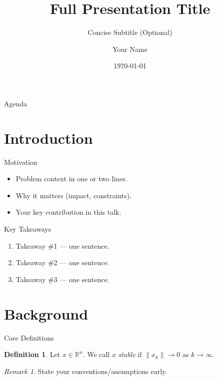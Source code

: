\documentclass[10pt,aspectratio=169]{beamer}
\title[Short Title]{Full Presentation Title}
\subtitle{Concise Subtitle (Optional)}
\author[Your Name]{Your Name}
\institute{Your Organization / Lab}
\date{\today}
\newcommand{\R}{\mathbb{R}}
\theoremstyle{definition}
\newtheorem{definition}{Definition}
\theoremstyle{plain}
\theoremstyle{remark}
\newtheorem{remark}{Remark}
\begin{document}
	
	\begin{frame}
		\titlepage
	\end{frame}
	
	\begin{frame}{Agenda}
		\tableofcontents
	\end{frame}
	
	\section{Introduction}
	
	\begin{frame}{Motivation}
		\begin{itemize}
			\item Problem context in one or two lines.
			\item Why it matters (impact, constraints).
			\item Your key contribution in this talk.
		\end{itemize}
	\end{frame}
	
	\begin{frame}{Key Takeaways}
		\begin{enumerate}
			\item Takeaway \#1 — one sentence.
			\item Takeaway \#2 — one sentence.
			\item Takeaway \#3 — one sentence.
		\end{enumerate}
	\end{frame}
	
	\section{Background}
	
	\begin{frame}{Core Definitions}
		\begin{definition}
			Let $x \in \R^n$. We call $x$ \emph{stable} if $\|x_k\|\to 0$ as $k\to\infty$.
		\end{definition}
		\begin{remark}
			State your conventions/assumptions early.
		\end{remark}
	\end{frame}
	
\end{document}
